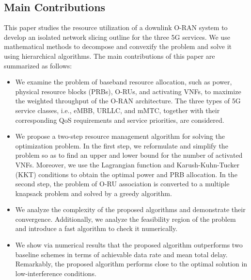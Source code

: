 \documentclass[lettersize,journal]{IEEEtran}
\begin{document}
\subsection{Main Contributions}
\vspace{-1mm}
This paper studies the resource utilization of a downlink O-RAN system to develop an isolated network slicing outline for the three 5G services.
We use mathematical methods to decompose and convexify the problem and solve it using hierarchical algorithms.
 The main contributions of this paper are summarized as follows:
\begin{itemize}
\item We examine the problem of baseband resource allocation, such as power, physical resource blocks (PRBs), O-RUs, and activating VNFs, to maximize the weighted throughput of the O-RAN architecture. The three types of 5G service classes, i.e., eMBB, URLLC, and mMTC, together with their corresponding QoS requirements and service priorities, are considered.
\item We propose a two-step resource management algorithm for solving the optimization problem.
In the first step, we reformulate and simplify the problem so as to find an upper and lower bound for the number of activated VNFs. Moreover, we use the Lagrangian function and Karush-Kuhn-Tucker (KKT) conditions to obtain the optimal power and PRB allocation. In the second step, the problem of O-RU association is converted to a multiple knapsack problem and solved by a greedy algorithm.
\item We analyze the complexity of the proposed algorithms and demonstrate their convergence. Additionally, we analyze the feasibility region of the problem and introduce a fast algorithm to check it numerically.
\item We show via numerical results that the proposed algorithm outperforms two baseline schemes in terms of achievable data rate and mean total delay. Remarkably, the proposed algorithm performs close to the optimal solution in low-interference conditions.
\end{itemize}
\vspace{-3mm}
\end{document}
